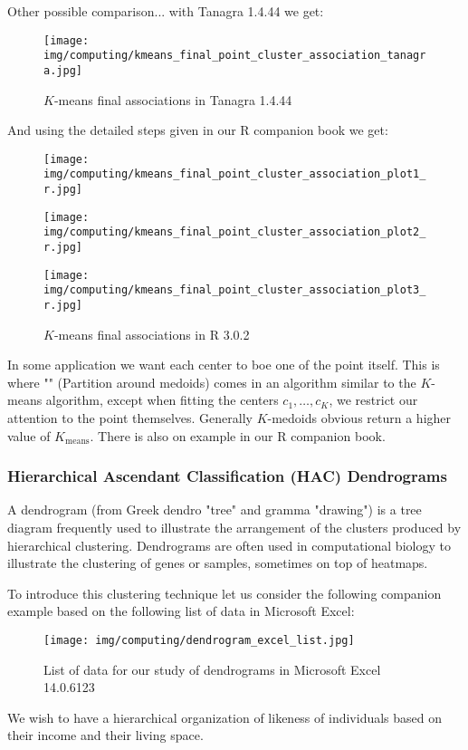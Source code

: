 	Other possible comparison... with Tanagra 1.4.44 we get:
	\begin{figure}[H]
		\centering
		\texttt{[image: img/computing/kmeans\_final\_point\_cluster\_association\_tanagra.jpg]}
		\caption[]{$K$-means final associations in Tanagra 1.4.44}
	\end{figure}
	And using the detailed steps given in our R companion book we get:
	\begin{figure}[H]
		\centering
		\texttt{[image: img/computing/kmeans\_final\_point\_cluster\_association\_plot1\_r.jpg]}
	\end{figure}
	\begin{figure}[H]
		\centering
		\texttt{[image: img/computing/kmeans\_final\_point\_cluster\_association\_plot2\_r.jpg]}
	\end{figure}
	\begin{figure}[H]
		\centering
		\texttt{[image: img/computing/kmeans\_final\_point\_cluster\_association\_plot3\_r.jpg]}
		\caption[]{$K$-means final associations in R 3.0.2}
	\end{figure}
	\begin{tcolorbox}[title=Remark,colframe=black,arc=10pt]
	In some application we want each center to boe one of the point itself. This is where "" (Partition around medoids) comes in an algorithm similar to the $K$-means algorithm, except when fitting the centers $c_1,\ldots,c_K$, we restrict our attention to the point themselves. Generally $K$-medoids obvious return a higher value of $K_{\text{means}}$. There is also on example in our R companion book.
	\end{tcolorbox}
	
	\subsubsection{Hierarchical Ascendant Classification (HAC) Dendrograms}
	A dendrogram (from Greek dendro "tree" and gramma "drawing") is a tree diagram frequently used to illustrate the arrangement of the clusters produced by hierarchical clustering. Dendrograms are often used in computational biology to illustrate the clustering of genes or samples, sometimes on top of heatmaps.
	
	To introduce this clustering technique let us consider the following companion example based on the following list of data in Microsoft Excel:
	\begin{figure}[H]
		\centering
		\texttt{[image: img/computing/dendrogram\_excel\_list.jpg]}
		\caption[]{List of data for our study of dendrograms in Microsoft Excel 14.0.6123}
	\end{figure}
	We wish to have a hierarchical organization of likeness of individuals based on their income and their living space. 

